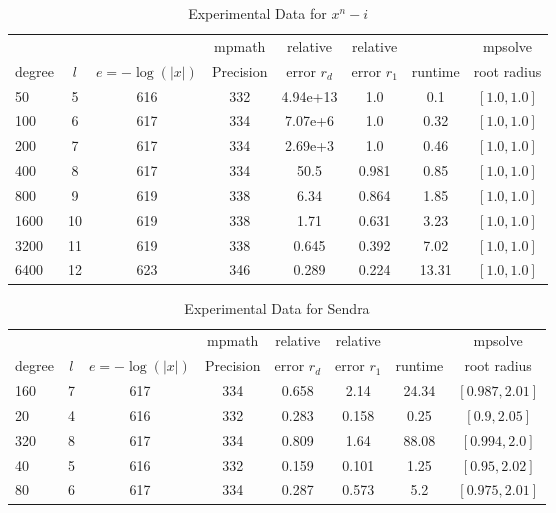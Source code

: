 \documentclass[sigconf]{acmart}
\begin{document}
\begin{table}[t]
\caption{Experimental Data for $x^n - i$}
\label{tab:nrooti}
\vskip -0.15in
\begin{center}
\begin{small}
\begin{sc}
\begin{tabular}{lccccccc}
\toprule
&  &  & mpmath & relative  & relative &  & mpsolve \\
degree  & $l$& $e=-\log(|x|)$& Precision &error $r_d$       & error $r_1$ &runtime& root radius\\
\midrule
 50 & 5 & 616 & 332 & 4.94e+13 & 1.0 & 0.1 & $[1.0, 1.0]$\\
 100 & 6 & 617 & 334 & 7.07e+6 & 1.0 & 0.32 & $[1.0, 1.0]$\\
  200 & 7 & 617 & 334 & 2.69e+3 & 1.0 & 0.46 & $[1.0, 1.0]$\\
 400 & 8 & 617 & 334 & 50.5 & 0.981 & 0.85 & $[1.0, 1.0]$\\
 800 & 9 & 619 & 338 & 6.34 & 0.864 & 1.85 & $[1.0, 1.0]$\\
 1600 & 10 & 619 & 338 & 1.71 & 0.631 & 3.23 & $[1.0, 1.0]$\\
 3200 & 11 & 619 & 338 & 0.645 & 0.392 & 7.02 & $[1.0, 1.0]$\\
 6400 & 12 & 623 & 346 & 0.289 & 0.224 & 13.31 & $[1.0, 1.0]$\\
\bottomrule
\end{tabular}
\end{sc}
\end{small}
\end{center}
\vskip 0.05in
\end{table}

\begin{table}[t]
\caption{Experimental Data for Sendra}
\label{tab:sendra}
\vskip -0.15in
\begin{center}
\begin{small}
\begin{sc}
\begin{tabular}{lccccccc}
\toprule
&  &  & mpmath & relative  & relative &  & mpsolve \\
degree  & $l$& $e=-\log(|x|)$& Precision &error $r_d$       & error $r_1$ &runtime& root radius\\
\midrule
 160 & 7 & 617 & 334 & 0.658 & 2.14 & 24.34 & $[0.987, 2.01]$\\
 20 & 4 & 616 & 332 & 0.283 & 0.158 & 0.25 & $[0.9, 2.05]$\\
 320 & 8 & 617 & 334 & 0.809 & 1.64 & 88.08 & $[0.994, 2.0]$\\
 40 & 5 & 616 & 332 & 0.159 & 0.101 & 1.25 & $[0.95, 2.02]$\\
 80 & 6 & 617 & 334 & 0.287 & 0.573 & 5.2 & $[0.975, 2.01]$\\
\bottomrule
\end{tabular}
\end{sc}
\end{small}
\end{center}
\vskip 0.05in
\end{table}
\end{document}
